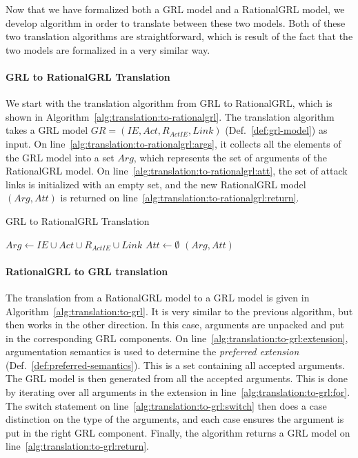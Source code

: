 Now that we have formalized both a GRL model and a RationalGRL model, we develop algorithm in order to translate between these two models. Both of these two translation algorithms are straightforward, which is result of the fact that the two models are formalized in a very similar way.

\paragraph{GRL to RationalGRL Translation} We start with the translation algorithm from GRL to RationalGRL, which is shown in Algorithm~\ref{alg:translation:to-rationalgrl}. The translation algorithm takes a GRL model $GR=(IE, Act, R_{ActIE}, Link)$ (Def.~\ref{def:grl-model}) as input. On line~\ref{alg:translation:to-rationalgrl:args}, it collects all the elements of the GRL model into a set $Arg$, which represents the set of arguments of the RationalGRL model. On line~\ref{alg:translation:to-rationalgrl:att}, the set of attack links is initialized with an empty set, and the new RationalGRL model $(Arg, Att)$ is returned on line~\ref{alg:translation:to-rationalgrl:return}.

\begin{algorithm}[h]
  \caption{GRL to RationalGRL Translation}
  \label{alg:translation:to-rationalgrl}
  \begin{algorithmic}[1]
    \State $Arg \leftarrow IE\cup Act \cup R_{ActIE}\cup Link$\label{alg:translation:to-rationalgrl:args}
    \State $Att \leftarrow \emptyset$\label{alg:translation:to-rationalgrl:att}
    \State \Return $(Arg, Att)$\label{alg:translation:to-rationalgrl:return}
    \EndProcedure
  \end{algorithmic}
\end{algorithm}

\paragraph{RationalGRL to GRL translation} The translation from a RationalGRL model to a GRL model is given in Algorithm~\ref{alg:translation:to-grl}. It is very similar to the previous algorithm, but then works in the other direction. In this case, arguments are unpacked and put in the corresponding GRL components. On line~\ref{alg:translation:to-grl:extension}, argumentation semantics is used to determine the \emph{preferred extension} (Def.~\ref{def:preferred-semantics}). This is a set containing all accepted arguments. The GRL model is then generated from all the accepted arguments. This is done by iterating over all arguments in the extension in line~\ref{alg:translation:to-grl:for}. The switch statement on line~\ref{alg:translation:to-grl:switch} then does a case distinction on the type of the arguments, and each case ensures the argument is put in the right GRL component. Finally, the algorithm returns a GRL model on line~\ref{alg:translation:to-grl:return}.

